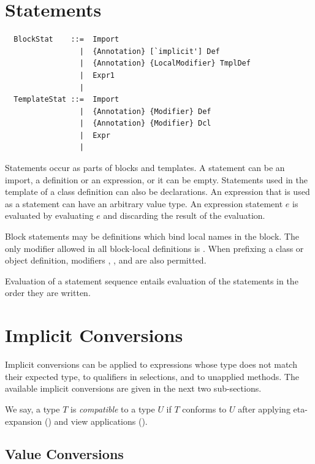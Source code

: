 \section{Statements}
\label{sec:statements}

\syntax\begin{lstlisting}
  BlockStat    ::=  Import
                 |  {Annotation} [`implicit'] Def
                 |  {Annotation} {LocalModifier} TmplDef
                 |  Expr1
                 | 
  TemplateStat ::=  Import
                 |  {Annotation} {Modifier} Def
                 |  {Annotation} {Modifier} Dcl
                 |  Expr
                 | 
\end{lstlisting}

Statements occur as parts of blocks and templates.  A statement can be
an import, a definition or an expression, or it can be empty.
Statements used in the template of a class definition can also be
declarations.  An expression that is used as a statement can have an
arbitrary value type. An expression statement $e$ is evaluated by
evaluating $e$ and discarding the result of the evaluation. 

Block statements may be definitions which bind local names in the
block. The only modifier allowed in all block-local definitions is
. When prefixing a class or object definition,
modifiers , , and  are also
permitted.

Evaluation of a statement sequence entails evaluation of the
statements in the order they are written.

\section{Implicit Conversions}
\label{sec:impl-conv}

Implicit conversions can be applied to expressions whose type does not
match their expected type, to qualifiers in selections, and to unapplied methods. The
available implicit conversions are given in the next two sub-sections.

We say, a type $T$ is {\em compatible} to a type $U$ if $T$ conforms
to $U$ after applying eta-expansion () and view applications
().

\subsection{Value Conversions}

